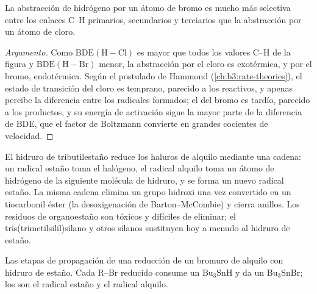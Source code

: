 \begin{proposition}\label{prop:b3:radicals-carbenes:halogenation-selectivity}
La abstracción de hidrógeno por un átomo de bromo es mucho más selectiva entre los enlaces C--H primarios,
secundarios y terciarios que la abstracción por un átomo de cloro.
\end{proposition}

\begin{proof}[Argumento]
Como $\mathrm{BDE(H{-}Cl)}$ es mayor que todos los valores C--H de la figura y $\mathrm{BDE(H{-}Br)}$ menor,
la abstracción por el cloro es exotérmica, y por el bromo, endotérmica. Según el postulado
de Hammond (\cref{ch:b3:rate-theories}), el estado de transición del cloro es temprano,
parecido a los reactivos, y apenas percibe la diferencia entre los radicales formados;
el del bromo es tardío, parecido a los productos, y su energía de activación sigue la mayor parte de
la diferencia de BDE, que el factor de Boltzmann convierte en grandes cocientes de velocidad.
\end{proof}

El hidruro de tributilestaño reduce los haluros de alquilo mediante una cadena: un radical estaño toma el
halógeno, el radical alquilo toma un átomo de hidrógeno de la siguiente molécula de
hidruro, y se forma un nuevo radical estaño. La misma cadena elimina un grupo hidroxi
una vez convertido en un tiocarbonil éster (la desoxigenación de
Barton--McCombie) y cierra anillos. Los residuos de organoestaño son tóxicos y difíciles de
eliminar; el tris(trimetilsilil)silano y otros silanos sustituyen hoy a menudo al hidruro
de estaño.

\begin{omfigure}

{\small Las etapas de propagación de una reducción de un bromuro de alquilo con hidruro de estaño.
Cada R--Br reducido consume un $\mathrm{Bu_3SnH}$ y da un $\mathrm{Bu_3SnBr}$; los 
son el radical estaño y el radical alquilo.}
\end{omfigure}


